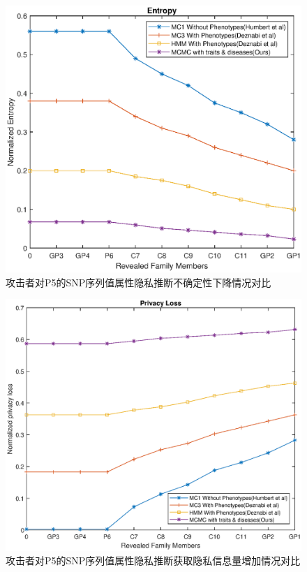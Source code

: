 \begin{figure}[htbp]
	\centering
	\includegraphics[width=0.8\linewidth]{./figures/P5entropy1.eps}
	\centering
	\caption{攻击者对P5的SNP序列值属性隐私推断不确定性下降情况对比}\label{fig:P5entropy1}
\end{figure}

\begin{figure}[htbp]
	\centering
	\includegraphics[width=0.8\linewidth]{./figures/P5privacyloss1.eps}
	\centering
	\caption{攻击者对P5的SNP序列值属性隐私推断获取隐私信息量增加情况对比}\label{fig:P5privacyloss1}
\end{figure}


